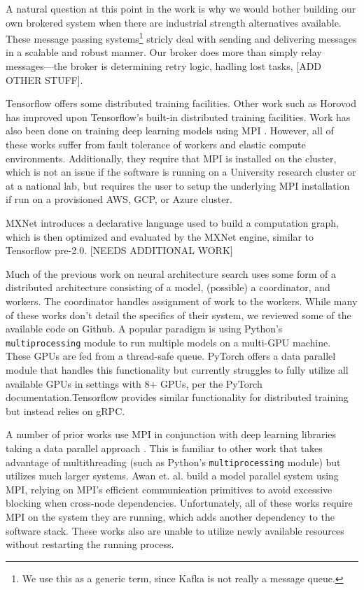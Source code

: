 \documentclass[conference]{IEEEtran}
\begin{document}
A natural question at this point in the work is why we would bother building our
own brokered system when there are industrial strength alternatives
available. These message passing systems\footnote{We use this as a generic term,
  since Kafka is not really a message queue.} stricly deal with sending and
delivering messages in a scalable and robust manner. Our broker does more than
simply relay messages---the broker is determining retry logic, hadling lost
tasks, [ADD OTHER STUFF].

Tensorflow \cite{tensorflow2015-whitepaper} offers some distributed training
facilities. Other work such as Horovod \cite{DBLP:journals/corr/abs-1802-05799}
has improved upon Tensorflow's built-in distributed training facilities. Work
has also been done on training deep learning models using MPI
\cite{pmlr-v28-coates13, DBLP:journals/corr/VishnuSD16}. However, all of these
works suffer from fault tolerance of workers and elastic compute
environments. Additionally, they require that MPI is installed on the cluster,
which is not an issue if the software is running on a University research
cluster or at a national lab, but requires the user to setup the underlying MPI
installation if run on a provisioned AWS, GCP, or Azure cluster.

MXNet \cite{DBLP:journals/corr/ChenLLLWWXXZZ15} introduces a declarative language
used to build a computation graph, which is then optimized and evaluated by the
MXNet engine, similar to Tensorflow pre-2.0. [NEEDS ADDITIONAL WORK]

Much of the previous work on neural architecture search uses some form of a
distributed architecture consisting of a model, (possible) a coordinator, and workers. The
coordinator handles assignment of work to the workers. While many of these works
don't detail the specifics of their system, we reviewed some of the available
code on Github. A popular paradigm is using Python's \texttt{multiprocessing}
module to run multiple models on a multi-GPU machine. These GPUs are fed from a
thread-safe queue. PyTorch offers a data parallel module that handles this
functionality  but currently struggles to fully utilize all available GPUs in
settings with 8+ GPUs, per the PyTorch documentation.Tensorflow provides similar
functionality for distributed training but instead relies on gRPC.

A number of prior works use MPI in conjunction with deep learning libraries
taking a data parallel approach \cite{Awan:2016:ELM:2966884.2966912,
  Awan:2017:SCM:3018743.3018769}. This is familiar to other work that takes
advantage of multithreading (such as Python's \texttt{multiprocessing} module)
but utilizes much larger systems. Awan et. al.
\cite{Awan:2018:OBD:3236367.3236381} build a model parallel system using
MPI, relying on MPI's efficient communication primitives to avoid excessive
blocking when cross-node dependencies. Unfortunately, all of these works
require MPI on the system they are running, which adds another dependency
to the software stack. These works also are unable to utilize newly available
resources without restarting the running process.
\end{document}
